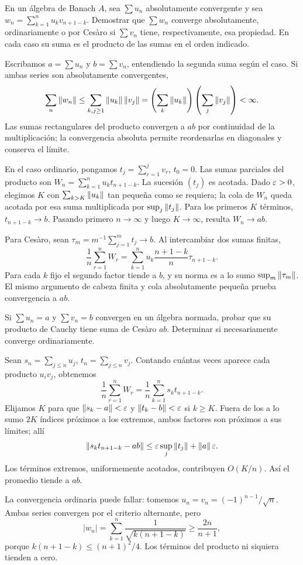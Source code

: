 \begin{ejercicio}\label{ej:v4-l01-6}
En un álgebra de Banach $A$, sea $\sum u_n$ absolutamente convergente y sea $w_n=\sum_{k=1}^nu_kv_{n+1-k}$. Demostrar que $\sum w_n$ converge absolutamente, ordinariamente o por Cesàro si $\sum v_n$ tiene, respectivamente, esa propiedad. En cada caso su suma es el producto de las sumas en el orden indicado.
\end{ejercicio}
\begin{solucion}
Escribamos $a=\sum u_n$ y $b=\sum v_n$, entendiendo la segunda suma según el caso. Si ambas series son absolutamente convergentes,
\[
 \sum_n\left\lVert w_n\right\rVert\leq\sum_{k,j\geq1}\left\lVert u_k\right\rVert\left\lVert v_j\right\rVert
 =\left(\sum_k\left\lVert u_k\right\rVert\right)\left(\sum_j\left\lVert v_j\right\rVert\right)<\infty.
\]
Las sumas rectangulares del producto convergen a $ab$ por continuidad de la multiplicación; la convergencia absoluta permite reordenarlas en diagonales y conserva el límite.

En el caso ordinario, pongamos $t_j=\sum_{r=1}^jv_r$, $t_0=0$. Las sumas parciales del producto son $W_n=\sum_{k=1}^nu_kt_{n+1-k}$. La sucesión $(t_j)$ es acotada. Dado $\varepsilon>0$, elegimos $K$ con $\sum_{k>K}\left\lVert u_k\right\rVert$ tan pequeña como se requiera; la cola de $W_n$ queda acotada por esa suma multiplicada por $\sup_j\left\lVert t_j\right\rVert$. Para los primeros $K$ términos, $t_{n+1-k}\to b$. Pasando primero $n\to\infty$ y luego $K\to\infty$, resulta $W_n\to ab$.

Para Cesàro, sean $\tau_m=m^{-1}\sum_{j=1}^mt_j\to b$. Al intercambiar dos sumas finitas,
\[
 \frac1n\sum_{r=1}^nW_r
 =\sum_{k=1}^nu_k\frac{n+1-k}{n}\tau_{n+1-k}.
\]
Para cada $k$ fijo el segundo factor tiende a $b$, y su norma es a lo sumo $\sup_m\left\lVert\tau_m\right\rVert$. El mismo argumento de cabeza finita y cola absolutamente pequeña prueba convergencia a $ab$.
\end{solucion}

\begin{ejercicio}\label{ej:v4-l01-7}
Si $\sum u_n=a$ y $\sum v_n=b$ convergen en un álgebra normada, probar que su producto de Cauchy tiene suma de Cesàro $ab$. Determinar si necesariamente converge ordinariamente.
\end{ejercicio}
\begin{solucion}
Sean $s_n=\sum_{j\leq n}u_j$, $t_n=\sum_{j\leq n}v_j$. Contando cuántas veces aparece cada producto $u_iv_j$, obtenemos
\[
 \frac1n\sum_{r=1}^nW_r=\frac1n\sum_{k=1}^ns_kt_{n+1-k}.
\]
Elijamos $K$ para que $\left\lVert s_k-a\right\rVert<\varepsilon$ y $\left\lVert t_k-b\right\rVert<\varepsilon$ si $k\geq K$. Fuera de los a lo sumo $2K$ índices próximos a los extremos, ambos factores son próximos a sus límites; allí
\[
 \left\lVert s_kt_{n+1-k}-ab\right\rVert\leq\varepsilon\sup_j\left\lVert t_j\right\rVert+\left\lVert a\right\rVert\varepsilon.
\]
Los términos extremos, uniformemente acotados, contribuyen $O(K/n)$. Así el promedio tiende a $ab$.

La convergencia ordinaria puede fallar: tomemos $u_n=v_n=(-1)^{n-1}/\sqrt n$. Ambas series convergen por el criterio alternante, pero
\[
 |w_n|=\sum_{k=1}^n\frac1{\sqrt{k(n+1-k)}}\geq\frac{2n}{n+1},
\]
porque $k(n+1-k)\leq(n+1)^2/4$. Los términos del producto ni siquiera tienden a cero.
\end{solucion}

